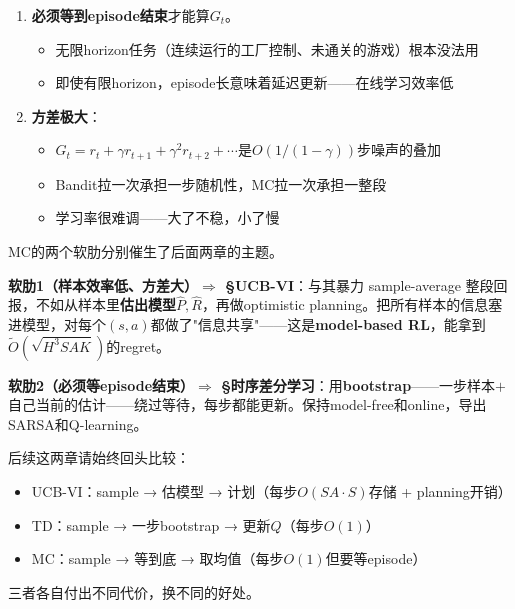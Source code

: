 \documentclass[11pt,a4paper]{article}
\theoremstyle{definition}
\begin{document}
\begin{keypoint}[MC不适用的场景]
\begin{enumerate}
\item \textbf{必须等到episode结束}才能算$G_t$。
\begin{itemize}
\item 无限horizon任务（连续运行的工厂控制、未通关的游戏）根本没法用
\item 即使有限horizon，episode长意味着延迟更新——在线学习效率低
\end{itemize}

\item \textbf{方差极大}：
\begin{itemize}
\item $G_t = r_t + \gamma r_{t+1} + \gamma^2 r_{t+2} + \cdots$是$O(1/(1-\gamma))$步噪声的叠加
\item Bandit拉一次承担一步随机性，MC拉一次承担一整段
\item 学习率很难调——大了不稳，小了慢
\end{itemize}
\end{enumerate}
\end{keypoint}

\begin{plainwords}[两条改进路线 = 后面两章]
MC的两个软肋分别催生了后面两章的主题。

\textbf{软肋1（样本效率低、方差大）$\Rightarrow$ §UCB-VI}：与其暴力 sample-average 整段回报，不如从样本里\textbf{估出模型}$\hat P, \hat R$，再做optimistic planning。把所有样本的信息塞进模型，对每个$(s,a)$都做了"信息共享"——这是\textbf{model-based RL}，能拿到$\tilde O(\sqrt{H^3 SAK})$的regret。

\textbf{软肋2（必须等episode结束）$\Rightarrow$ §时序差分学习}：用\textbf{bootstrap}——一步样本$+$ 自己当前的估计——绕过等待，每步都能更新。保持model-free和online，导出SARSA和Q-learning。

后续这两章请始终回头比较：
\begin{itemize}
\item UCB-VI：sample → 估模型 → 计划（每步$O(SA \cdot S)$存储 + planning开销）
\item TD：sample → 一步bootstrap → 更新$Q$（每步$O(1)$）
\item MC：sample → 等到底 → 取均值（每步$O(1)$但要等episode）
\end{itemize}
三者各自付出不同代价，换不同的好处。
\end{plainwords}

\end{document}
